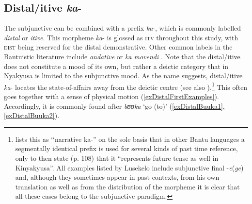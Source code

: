 \subsection{Distal/itive \textit{ka}-}\label{DistalKa}
The subjunctive can be combined with a prefix \textit{ka}-, which is commonly labelled \textit{distal} or \textit{itive}. This morpheme \textit{ka}- is glossed as \textsc{itv} throughout this study, with \textsc{dist} being reserved for the distal demonstrative. Other common labels in the Bantuistic literature include \textit{andative} or \textit{ka movendi} \citep[242]{NurseD2008}. Note that the distal/itive does not constitute a mood of its own, but rather a deictic category that in Nyakyusa is limited to the subjunctive mood. As the name suggests, distal/itive \textit{ka}- locates the state-of-affairs away from the deictic centre (see also \citealt{BotneR1999}).\footnote{\citet[106--109]{LusekeloA2013} lists this as \lq\lq narrative ka-'' on the sole basis that in other Bantu languages a segmentally identical prefix is used for several kinds of past time reference, only to then state (p. 108) that it ``represents future tense as well in Kinyakyusa''. All examples listed by Lusekelo include subjunctive final -\textit{e}(\textit{ge}) and, although they sometimes appear in past contexts, from his own translation as well as from the distribution of the morpheme it is clear that all these cases belong to the subjunctive paradigm.} This often goes together with a sense of physical motion (\ref{exDistalFirstExamples}). Accordingly, it is commonly found after \textit{bʊʊka} \lq go (to)' (\ref{exDistalBuuka1}, \ref{exDistalBuuka2}).
